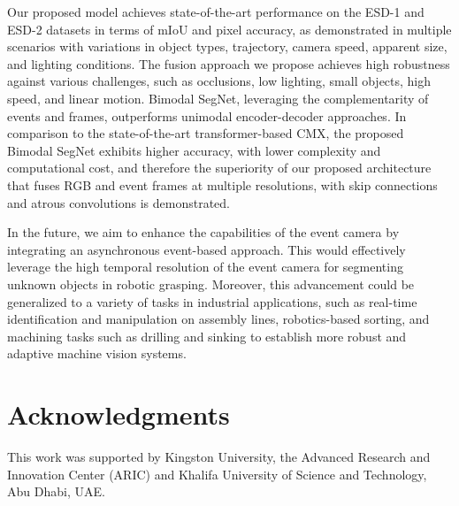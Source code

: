 \documentclass[lettersize,journal]{IEEEtran}
\begin{document}
Our proposed model achieves state-of-the-art performance on the ESD-1 and ESD-2 datasets in terms of mIoU and pixel accuracy, as demonstrated in multiple scenarios with variations in object types, trajectory, camera speed, apparent size, and lighting conditions. The fusion approach we propose achieves high robustness against various challenges, such as occlusions, low lighting, small objects, high speed, and linear motion. Bimodal SegNet, leveraging the complementarity of events and frames, outperforms unimodal encoder-decoder approaches. In comparison to the state-of-the-art transformer-based CMX, the proposed Bimodal SegNet exhibits higher accuracy, with lower complexity and computational cost, and therefore the superiority of our proposed architecture that fuses RGB and event frames at multiple resolutions, with skip connections and atrous convolutions is demonstrated.


In the future, we aim to enhance the capabilities of the event camera by integrating an asynchronous event-based approach. This would effectively leverage the high temporal resolution of the event camera for segmenting unknown objects in robotic grasping. Moreover, this advancement could be generalized to a variety of tasks in industrial applications, such as real-time identification and manipulation on assembly lines, robotics-based sorting, and machining tasks such as drilling and sinking to establish more robust and adaptive machine vision systems.




\section*{{Acknowledgments}}{This work was supported by Kingston University, the Advanced Research and Innovation Center (ARIC) and Khalifa University of Science and Technology, Abu Dhabi, UAE.}








\end{document}
